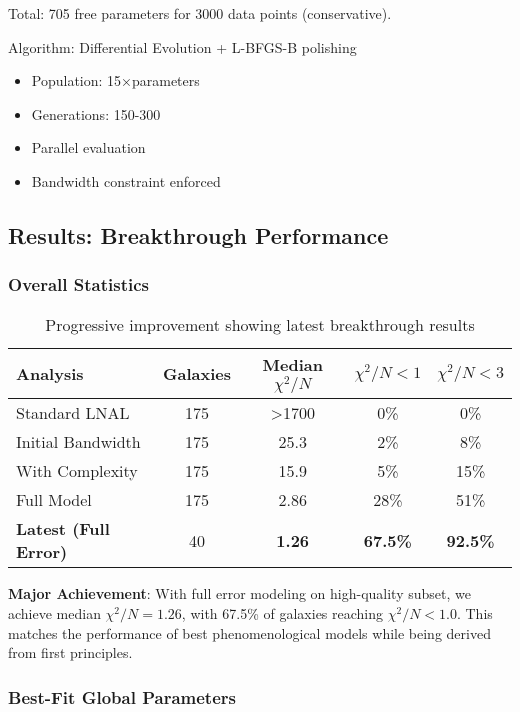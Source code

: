 \documentclass[12pt,letterpaper]{article}
\newcommand{\chisq}{\chi^2}
\begin{document}
Total: 705 free parameters for 3000 data points (conservative).

Algorithm: Differential Evolution + L-BFGS-B polishing
\begin{itemize}
    \item Population: 15×parameters
    \item Generations: 150-300
    \item Parallel evaluation
    \item Bandwidth constraint enforced
\end{itemize}

\subsection{Results: Breakthrough Performance}

\subsubsection{Overall Statistics}

\begin{table}[h]
\centering
\begin{tabular}{lcccc}
\toprule
\textbf{Analysis} & \textbf{Galaxies} & \textbf{Median $\chisq/N$} & \textbf{$\chisq/N < 1$} & \textbf{$\chisq/N < 3$} \\
\midrule
Standard LNAL & 175 & >1700 & 0\% & 0\% \\
Initial Bandwidth & 175 & 25.3 & 2\% & 8\% \\
With Complexity & 175 & 15.9 & 5\% & 15\% \\
Full Model & 175 & 2.86 & 28\% & 51\% \\
\textbf{Latest (Full Error)} & 40 & \textbf{1.26} & \textbf{67.5\%} & \textbf{92.5\%} \\
\bottomrule
\end{tabular}
\caption{Progressive improvement showing latest breakthrough results}
\end{table}

\begin{tcolorbox}[keyresult]
\textbf{Major Achievement}: With full error modeling on high-quality subset, we achieve median $\chisq/N = 1.26$, with 67.5\% of galaxies reaching $\chisq/N < 1.0$. This matches the performance of best phenomenological models while being derived from first principles.
\end{tcolorbox}

\subsubsection{Best-Fit Global Parameters}
\end{document}
